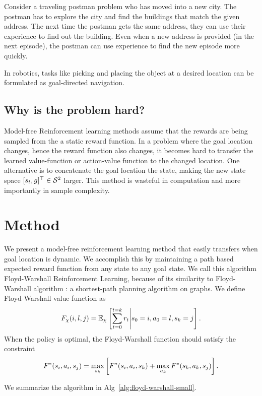 Consider a traveling postman problem who has moved into a new city. The
postman has to explore the city and find the buildings that match the
given address.  The next time the postman gets the same address, they
can use their experience to find out the building.  Even when a new
address is provided (in the next episode), the postman can use
experience to find the new episode more quickly.

In robotics, tasks like picking and placing the object at a desired
location can be formulated as goal-directed navigation.

\subsection{Why is the problem hard?}
Model-free Reinforcement learning methods assume that the rewards are
being sampled from the a static reward function.  In a problem where the
goal location changes, hence the reward function also changes, it
becomes hard to transfer the learned value-function or action-value
function to the changed location.  One alternative is to concatenate the
goal location the state, making the new state space $[s_t,
g]^\top \in \mathcal{S}^2$ larger.  This method is wasteful in
computation and more importantly in sample complexity.

\section{Method}
We present a model-free reinforcement learning method that easily
transfers when goal location is dynamic.  We accomplish this by
maintaining a path based expected reward function from any state to any
goal state.  We call this algorithm Floyd-Warshall Reinforcement
Learning, because of its similarity to Floyd-Warshall algorithm : a
shortest-path planning algorithm on graphs.  We define Floyd-Warshall
value function as
%
\begin{align}
F_{\chi}(i, l,  j) =
\mathbb{E}_{\chi}\left[ \sum_{t=0}^{t=k} r_t \middle\vert s_0 = i, a_0 = l, s_k = j \right] .
\end{align}%
%
When the policy is optimal, the Floyd-Warshall function should satisfy the constraint
%
\begin{align}
F^*(s_i, a_i, s_j) = \max_{s_k} \left[
F^*(s_i, a_i, s_k)
+ \max_{a_k}F^*(s_k, a_k, s_j) \right] .
\end{align}%
%

We summarize the algorithm in Alg~\ref{alg:floyd-warshall-small}.



